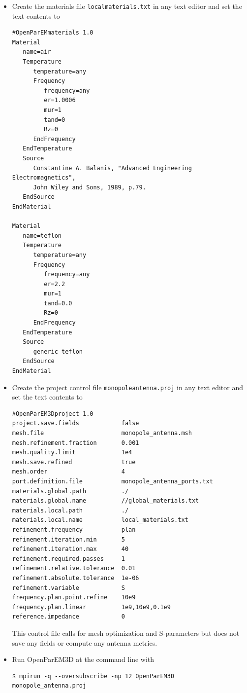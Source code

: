 \documentclass[titlepage]{article}
\renewcommand\_{\textunderscore\linebreak[1]}
\begin{document}
\begin{itemize}

\item Create the materials file \texttt{local\_materials.txt} in any text editor and set the text contents to
\begin{Verbatim}[fontsize=\small]
#OpenParEMmaterials 1.0
Material
   name=air
   Temperature
      temperature=any
      Frequency
         frequency=any
         er=1.0006
         mur=1
         tand=0
         Rz=0
      EndFrequency
   EndTemperature
   Source
      Constantine A. Balanis, "Advanced Engineering Electromagnetics",
      John Wiley and Sons, 1989, p.79.
   EndSource
EndMaterial

Material
   name=teflon
   Temperature
      temperature=any
      Frequency
         frequency=any
         er=2.2
         mur=1
         tand=0.0
         Rz=0
      EndFrequency
   EndTemperature
   Source
      generic teflon
   EndSource
EndMaterial
\end{Verbatim}

\item Create the project control file \texttt{monopole\_antenna.proj} in any text editor and set the text contents to
\begin{Verbatim}[fontsize=\small]
#OpenParEM3Dproject 1.0
project.save.fields            false
mesh.file                      monopole_antenna.msh
mesh.refinement.fraction       0.001
mesh.quality.limit             1e4
mesh.save.refined              true
mesh.order                     4
port.definition.file           monopole_antenna_ports.txt
materials.global.path          ./
materials.global.name          //global_materials.txt
materials.local.path           ./ 
materials.local.name           local_materials.txt
refinement.frequency           plan
refinement.iteration.min       5
refinement.iteration.max       40
refinement.required.passes     1
refinement.relative.tolerance  0.01
refinement.absolute.tolerance  1e-06
refinement.variable            S
frequency.plan.point.refine    10e9
frequency.plan.linear          1e9,10e9,0.1e9
reference.impedance            0
\end{Verbatim}
\noindent This control file calls for mesh optimization and S-parameters but does not save any fields or compute any antenna metrics.

\item Run OpenParEM3D at the command line with
\begin{Verbatim}[fontsize=\small]
   $ mpirun -q --oversubscribe -np 12 OpenParEM3D monopole_antenna.proj
\end{Verbatim}


\end{itemize}
\end{document}
